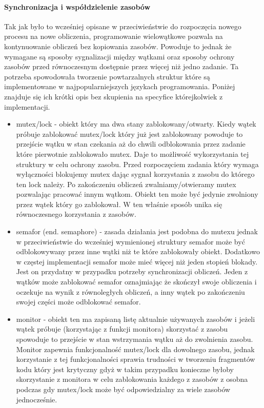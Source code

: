 \documentclass[a4paper,12pt]{article}
\begin{document}
\paragraph{Synchronizacja i współdzielenie zasobów}

Tak jak było to wcześniej opisane w przeciwieństwie do rozpoczęcia nowego procesu na nowe obliczenia, programowanie wielowątkowe pozwala na kontynuowanie obliczeń bez kopiowania zasobów. 
Powoduje to jednak że wymagane są sposoby sygnalizacji między wątkami oraz sposoby ochrony zasobów przed równoczesnym dostępnie przez więcej niż jedno zadanie. 
Ta potrzeba spowodowała tworzenie powtarzalnych struktur które są implementowane w najpopularniejszych językach programowania. 
Poniżej znajduje się ich krótki opis bez skupienia na specyfice którejkolwiek z implementacji. 
\begin{itemize}
        \item mutex/lock - obiekt który ma dwa stany zablokowany/otwarty.
        Kiedy wątek próbuje zablokować mutex/lock który już jest zablokowany powoduje to przejście wątku w stan czekania aż do chwili odblokowania przez zadanie które pierwotnie zablokowało mutex.
        Daje to możliwość wykorzystania tej struktury w celu ochrony zasobu. Przed rozpoczęciem zadania który wymaga wyłączności blokujemy mutex dając sygnał korzystania z zasobu do którego ten lock należy. 
        Po zakończeniu obliczeń zwalniamy/otwieramy mutex pozwalając pracować innym wątkom. Obiekt ten może być jedynie zwolniony przez wątek który go zablokował. 
        W ten właśnie sposób unika się równoczesnego korzystania z zasobów. 
        \item semafor (end. semaphore) - zasada działania jest podobna do mutexu jednak w przeciwieństwie do wcześniej wymienionej struktury semafor może być odblokowywany przez inne wątki niż te które zablokowały obiekt. Dodatkowo w częstej implementacji semafor może mieć więcej niż jeden stopień blokady. 
        Jest on przydatny w przypadku potrzeby synchronizacji obliczeń. Jeden z wątków może zablokować semafor oznajmiając że skończył swoje obliczenia i oczekuje na wynik z równoległych obliczeń, a inny wątek po zakończeniu swojej części może odblokować semafor. 
        \item monitor - obiekt ten ma zapisaną listę aktualnie używanych zasobów i jeżeli wątek próbuje (korzystając z funkcji monitora) skorzystać z zasobu spowoduje to przejście w stan wstrzymania wątku aż do zwolnienia zasobu. 
        Monitor zapewnia funkcjonalność mutex/lock dla dowolnego zasobu, jednak korzystanie z tej funkcjonalności sprawia trudności w tworzeniu fragmentów kodu który jest krytyczny gdyż w takim przypadku konieczne byłoby skorzystanie z monitora w celu zablokowania każdego z zasobów z osobna podczas gdy mutex/lock może być odpowiedzialny za wiele zasobów jednocześnie.   
\end{itemize} 
\end{document}
